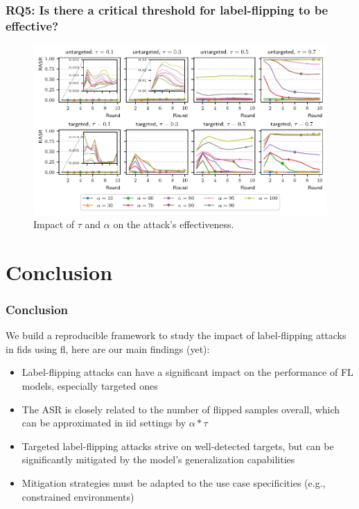\documentclass[color,t,presentation,english,aspectratio=169]{beamer}
\begin{document}
\begin{frame}
\frametitle{RQ5: Is there a critical threshold for label-flipping to be effective?}
\vspace{-2ex}
\begin{figure}
	\centering
	\includegraphics[width=.8\textwidth]{figures/attacks.pdf}
	\vspace{-2ex}
	\caption{Impact of $\tau$ and $\alpha$ on the attack's effectiveness.}
\end{figure}
\end{frame}



\section{Conclusion}

\begin{frame}
\frametitle{Conclusion}

We build a reproducible framework to study the impact of label-flipping attacks in \gls{fids} using \gls{fl}, here are our main findings (yet):

\begin{itemize}
    \item Label-flipping attacks can have a significant impact on the performance of FL models, especially targeted ones
    \item The ASR is closely related to the number of flipped samples overall, which can be approximated in \gls{iid} settings by $\alpha * \tau$
    \item Targeted label-flipping attacks strive on well-detected targets, but can be significantly mitigated by the model’s generalization capabilities
    \item Mitigation strategies must be adapted to the use case specificities (e.g., constrained environments)
\end{itemize}
\end{frame}
\end{document}
